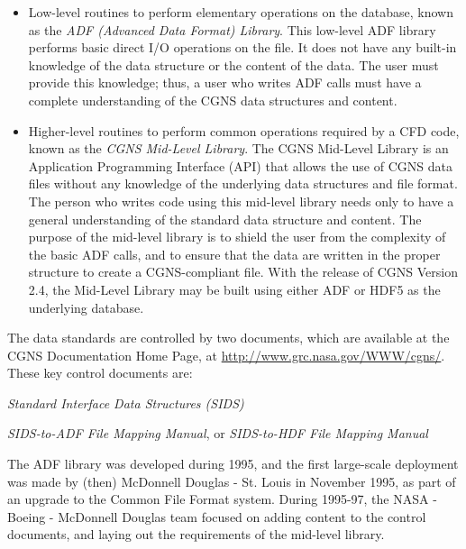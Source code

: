 \begin{itemize}
\item Low-level routines to perform elementary operations on the
      database, known as the \textit{ADF (Advanced Data Format) Library}.
      This low-level ADF library performs basic direct I/O operations on
      the file.
      It does not have any built-in knowledge of the data structure or
      the content of the data.
      The user must provide this knowledge; thus, a user who writes
      ADF calls must have a complete understanding of the CGNS data
      structures and content.
\item Higher-level routines to perform common operations required by a
      CFD code, known as the \textit{CGNS Mid-Level Library}.
      The CGNS Mid-Level Library is an Application Programming Interface
      (API) that allows the use of CGNS data files without any knowledge
      of the underlying data structures and file format.
      The person who writes code using this mid-level library needs only
      to have a general understanding of the standard data structure and
      content.
      The purpose of the mid-level library is to shield the user from
      the complexity of the basic ADF calls, and to ensure that the data
      are written in the proper structure to create a CGNS-compliant
      file.
      With the release of CGNS Version 2.4, the Mid-Level Library may be
      built using either ADF or HDF5 as the underlying database.
\end{itemize}

The data standards are controlled by two documents, which are available
at the CGNS Documentation Home Page, at
\url{http://www.grc.nasa.gov/WWW/cgns/}.
These key control documents are:

\begin{itemize*}
\item \textit{Standard Interface Data Structures (SIDS)}
\item \textit{SIDS-to-ADF File Mapping Manual}, or
      \textit{SIDS-to-HDF File Mapping Manual}
\end{itemize*}

The ADF library was developed during 1995, and the first large-scale
deployment was made by (then) McDonnell Douglas - St. Louis in November
1995, as part of an upgrade to the Common File Format system.
During 1995-97, the NASA - Boeing - McDonnell Douglas team focused on
adding content to the control documents, and laying out the requirements
of the mid-level library.

